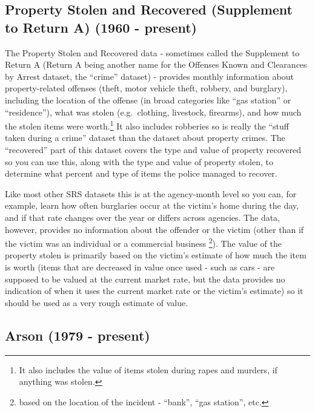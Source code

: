\documentclass[
]{krantz}
\begin{document}
\subsection{Property Stolen and Recovered (Supplement to
Return A) (1960 -
present)}\label{property-stolen-and-recovered-supplement-to-return-a-1960---present}

The Property Stolen and Recovered data - sometimes called
the Supplement to Return A (Return A being another name for
the Offenses Known and Clearances by Arrest dataset, the
``crime'' dataset) - provides monthly information about
property-related offenses (theft, motor vehicle theft,
robbery, and burglary), including the location of the
offense (in broad categories like ``gas station'' or
``residence''), what was stolen (e.g.~clothing, livestock,
firearms), and how much the stolen items were
worth.\footnote{It also includes the value of items stolen
  during rapes and murders, if anything was stolen.} It also
includes robberies so is really the ``stuff taken during a
crime'' dataset than the dataset about property crimes. The
``recovered'' part of this dataset covers the type and value
of property recovered so you can use this, along with the
type and value of property stolen, to determine what percent
and type of items the police managed to recover.

Like most other SRS datasets this is at the agency-month
level so you can, for example, learn how often burglaries
occur at the victim's home during the day, and if that rate
changes over the year or differs across agencies. The data,
however, provides no information about the offender or the
victim (other than if the victim was an individual or a
commercial business \footnote{based on the location of the
  incident - ``bank'', ``gas station'', etc.}). The value of
the property stolen is primarily based on the victim's
estimate of how much the item is worth (items that are
decreased in value once used - such as cars - are supposed
to be valued at the current market rate, but the data
provides no indication of when it uses the current market
rate or the victim's estimate) so it should be used as a
very rough estimate of value.

\subsection{Arson (1979 -
present)}\label{arson-1979---present}
\end{document}
